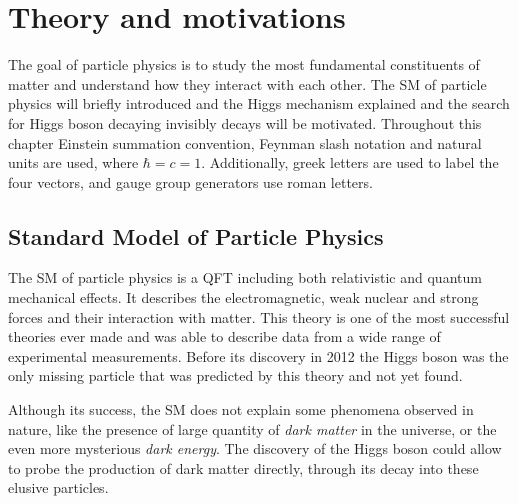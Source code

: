 \chapter{Theory and motivations}
\label{CHAPTER:TheoryAndMotivations}

\glsresetall %


The goal of particle physics is to study the most fundamental constituents of matter and understand how they interact with each other. The \gls{SM} of particle physics will briefly introduced and the Higgs mechanism explained and the search for Higgs boson decaying invisibly decays will be motivated. Throughout this chapter Einstein summation convention, Feynman slash notation and natural units are used, where $\hbar=c=1$. Additionally, greek letters are used to label the four vectors, and gauge group generators use roman letters.

\section{Standard Model of Particle Physics}


The \gls{SM} of particle physics is a \gls{QFT} including both relativistic and quantum mechanical effects. It describes the electromagnetic, weak nuclear and strong forces and their interaction with matter. This theory is one of the most successful theories ever made and was able to describe data from a wide range of experimental measurements. Before its discovery in 2012 \cite{ARTICLE:ATLAS_HiggsDiscovery,ARTICLE:CMS_HiggsDiscovery} the Higgs boson was the only missing particle that was predicted by this theory and not yet found. 

Although its success, the \gls{SM} does not explain some phenomena observed in nature, like the presence of large quantity of \textit{dark matter} in the universe, or the even more mysterious \textit{dark energy}. The discovery of the Higgs boson could allow to probe the production of dark matter directly, through its decay into these elusive particles. 

